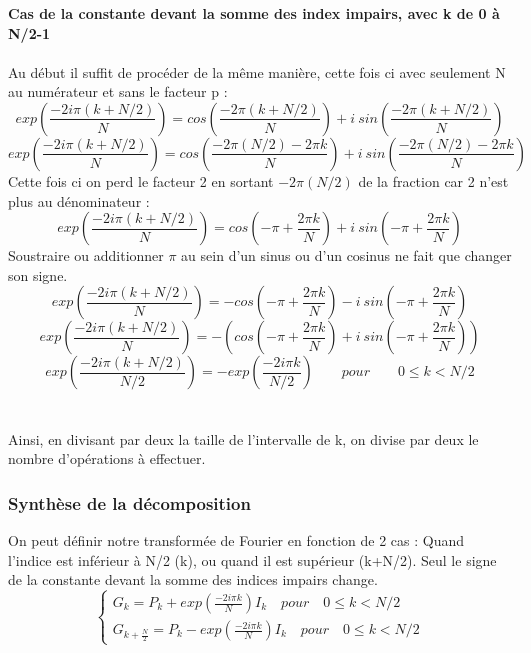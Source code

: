\documentclass{article}
\begin{document}
\noindent\qquad \textbf{Cas de la constante devant la somme des index impairs, avec k de 0 à N/2-1}\\~\\
Au début il suffit de procéder de la même manière, cette fois ci avec seulement N au numérateur et sans le facteur p :
\begin{equation}
	exp(\frac{-2i\pi (k+N/2)}{N}) = cos(\frac{-2\pi (k+N/2)}{N})+i\:sin(\frac{-2\pi (k+N/2)}{N})
\end{equation}
\begin{equation}
	exp(\frac{-2i\pi (k+N/2)}{N}) = cos(\frac{-2\pi (N/2)-2\pi k}{N})+i\:sin(\frac{-2\pi (N/2)-2\pi k}{N})
\end{equation}
Cette fois ci on perd le facteur 2 en sortant $-2\pi (N/2)$ de la fraction car 2 n'est plus au dénominateur :
\begin{equation}
	exp(\frac{-2i\pi (k+N/2)}{N}) = cos(-\pi +\frac{2\pi k}{N})+i\:sin(-\pi +\frac{2\pi k}{N})
\end{equation}
Soustraire ou additionner $\pi$ au sein d'un sinus ou d'un cosinus ne fait que changer son signe. 
\begin{equation}
	exp(\frac{-2i\pi (k+N/2)}{N}) = - cos(-\pi +\frac{2\pi k}{N})-i\:sin(-\pi +\frac{2\pi k}{N})
\end{equation}
\begin{equation}
	exp(\frac{-2i\pi (k+N/2)}{N}) = - ( cos(-\pi +\frac{2\pi k}{N})+i\:sin(-\pi +\frac{2\pi k}{N}))
\end{equation}
\begin{equation}
	exp(\frac{-2i\pi (k+N/2)}{N/2}) = - exp(\frac{-2i\pi k}{N/2}) \qquad pour \qquad 0 \leq k < N/2
\end{equation}\\~\\

\noindent Ainsi, en divisant par deux la taille de l'intervalle de k, on divise par deux le nombre d'opérations à effectuer.\\

\subsubsection{Synthèse de la décomposition}
On peut définir notre transformée de Fourier en fonction de 2 cas : Quand l'indice est inférieur à N/2 (k), ou quand il est supérieur (k+N/2). Seul le signe de la constante devant la somme des indices impairs change.
\begin{equation}
	\begin{cases}
		G_{k} = P_{k} + exp(\frac{-2i\pi k}{N}) I_{k} \quad pour \quad 0 \leq k < N/2\\
		G_{k+\frac{N}{2}} = P_{k} - exp(\frac{-2i\pi k}{N}) I_{k} \quad pour \quad 0 \leq k < N/2
	\end{cases}
\end{equation}
\end{document}
